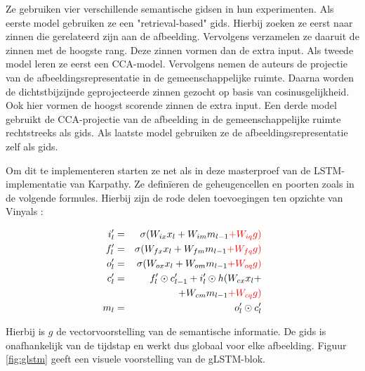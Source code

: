 Ze gebruiken vier verschillende semantische gidsen in hun experimenten. Als eerste model gebruiken ze een "retrieval-based" gids. Hierbij zoeken ze eerst naar zinnen die gerelateerd zijn aan de afbeelding. Vervolgens verzamelen ze daaruit de zinnen met de hoogste rang. Deze zinnen vormen dan de extra input.
Als tweede model leren ze eerst een CCA-model. Vervolgens nemen de auteurs de projectie van de afbeeldingsrepresentatie in de gemeenschappelijke ruimte. Daarna worden de dichtstbijzijnde geprojecteerde zinnen gezocht op basis van cosinusgelijkheid. Ook hier vormen de hoogst scorende zinnen de extra input.
Een derde model gebruikt de CCA-projectie van de afbeelding in de gemeenschappelijke ruimte rechtstreeks als gids.
Als laatste model gebruiken ze de afbeeldingsrepresentatie zelf als gids. 

Om dit te implementeren starten ze net als in deze masterproef van de LSTM-implementatie van Karpathy. Ze defin\"ieren de geheugencellen en poorten zoals in de volgende formules. Hierbij zijn de rode delen toevoegingen ten opzichte van Vinyals :

%
\begin{eqnarray}
\vspace{-3mm}
\label{glstm-memory-start}
i_l' & = & \sigma (W_{ix} x_l + W_{im} m_{l-1} \color{red}{+ W_{iq} g}) \label{glstm-input} \\
f_l' & = & \sigma (W_{fx} x_l + W_{fm} m_{l-1} \color{red}{+ W_{fq} g}) \\
o_l' & = & \sigma (W_{ox} x_l + W_{om} m_{l-1} \color{red}{+ W_{oq} g}) \\
c_l' & = & f_l' \odot c_{l-1}' + i_l' \odot h(W_{cx} x_l + \nonumber \\
&   & + W_{cm} m_{l-1} \color{red}{+ W_{cq} g}) \\
m_l & = & o_l' \odot c_l' 
\label{glstm-memory}
\vspace{-3mm}
\end{eqnarray}

Hierbij is $g$ de vectorvoorstelling van de semantische informatie. De gids is onafhankelijk van de tijdstap en werkt dus globaal voor elke afbeelding. Figuur \ref{fig:glstm} geeft een visuele voorstelling van de gLSTM-blok.

